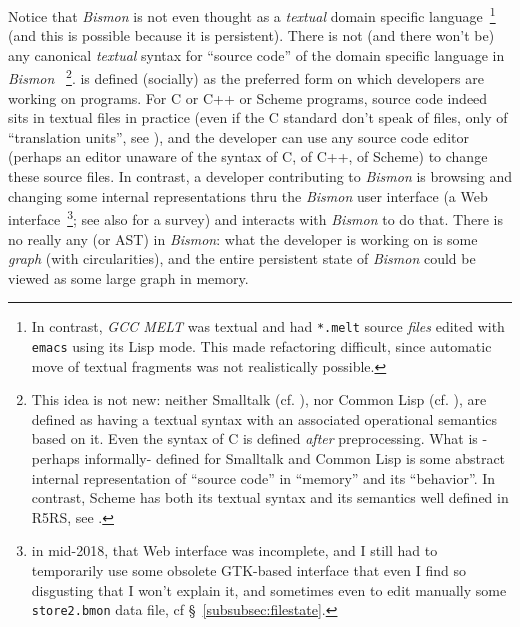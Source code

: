 Notice that \textit{Bismon} is not even thought as a \emph{textual}
domain specific language~\footnote{In contrast, \emph{GCC MELT} was
  textual and had \texttt{*.melt} source \emph{files} edited with
  \texttt{emacs} using its Lisp mode. This made refactoring difficult,
  since automatic move of textual fragments was not realistically
  possible.} (and this is possible because it is persistent). There is
not (and there won't be) any canonical \emph{textual} syntax for
``source code'' of the domain specific language in \textit{Bismon}
~\footnote{This idea is not new: neither Smalltalk
  (cf. \cite{Goldberg:1983:Smalltalk}), nor Common Lisp
  (cf. \cite{Steele:1990:CommonLisp}), are defined as having a textual
  syntax with an associated operational semantics based on it. Even
  the syntax of C is defined \emph{after} preprocessing. What is
  -perhaps informally- defined for Smalltalk and Common Lisp is some
  abstract internal representation of ``source code'' in ``memory''
  and its ``behavior''. In contrast, Scheme has both its textual
  syntax and its semantics well defined in R5RS, see
  \cite{Adams:1998:R5RS}.}.  is
defined (socially) as the preferred form on which developers are
working on programs. For C or C++ or Scheme programs, source code
indeed sits in textual files in practice (even if the C standard don't
speak of files, only of ``translation units'', see \cite{C11:std}),
and the developer can use any source code editor (perhaps an editor
unaware of the syntax of C, of C++, of Scheme) to change these source
files. In contrast, a developer contributing to \textit{Bismon} is
browsing and changing some internal representations thru the
\textit{Bismon} user interface (a Web interface~\footnote{in mid-2018,
  that Web interface was incomplete, and I still had to temporarily
  use some obsolete GTK-based interface that even I find so disgusting
  that I won't explain it, and sometimes even to edit manually some
  \texttt{store2.bmon} data file, cf \S~\ref{subsubsec:filestate}.};
see also \cite{Myers:2000:PPF} for a survey) and interacts with
\textit{Bismon} to do that. There is no really any  (or AST)  in
\textit{Bismon}: what the developer is working on is some \emph{graph}
(with circularities), and the entire persistent state of \emph{Bismon}
could be viewed as some large graph in memory.

